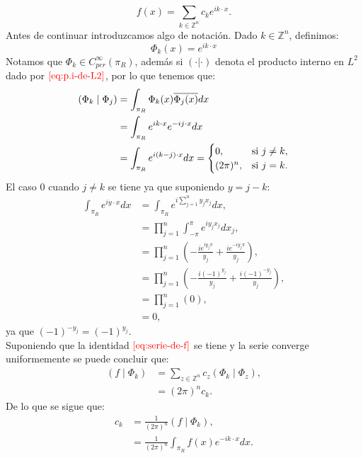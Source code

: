     \begin{equation}
      f(x)=\sum_{k\in\mathbb{Z}^{n}}c_ke^{ik\cdot x}.\label{eq:serie-de-f}
    \end{equation}
    Antes de continuar introduzcamos algo de notación. Dado $k\in\mathbb{Z}^n$, definimos:
    \begin{equation}
        \Phi_{k}(x)=e^{ik\cdot x}
    \end{equation}
    Notamos que $\Phi_k\in C^{\infty}_{per}(\pi_R)$, además si $(\cdot|\cdot)$ denota el producto interno en $L^2$ dado por $\textcolor{red}{\ref{eq:p.i-de-L2}}$, por lo que tenemos que:
    \begin{align}
      \left( \Phi_k \mid \Phi_j \right) &= \int_{\pi_R} \Phi_k(x) \overline{\Phi_j(x)} dx\notag\\ 
      &= \int_{\pi_R} e^{ik\cdot x} e^{-ij\cdot x}dx\notag{}\\
      &=\int_{\pi_R}e^{i(k-j)\cdot x}dx= 
      \begin{cases} 
        0, & \text{si } j \neq k, \\\label{eq:ortogonalidad-de-phi} 
        (2\pi)^n, & \text{si } j = k.
      \end{cases}
    \end{align}
    El caso $0$ cuando $j\neq k$ se tiene ya que suponiendo $y=j-k$:
    \begin{align*}
      \int_{\pi_R}e^{iy\cdot x}dx&=\int_{\pi_R}e^{i\sum_{j=1}^{n}y_jx_j}dx,\\
      &=\prod_{j=1}^{n}\int_{-\pi}^{\pi}e^{iy_jx_j}dx_j,\\
      &=\prod_{j=1}^{n}\left(-\frac{ie^{iy_j\pi}}{y_j}+\frac{ie^{-iy_j\pi}}{y_j}\right),\\
      &=\prod_{j=1}^{n}\left( -\frac{i(-1)^{y_j}}{y_j}+\frac{i(-1)^{-y_j}}{y_j} \right),\\
      &=\prod_{j=1}^{n}(0),\\
      &=0,
    \end{align*}
    ya que $(-1)^{-y_j}=(-1)^{y_j}$.\\
    Suponiendo que la identidad $\textcolor{red}{\ref{eq:serie-de-f}}$ se tiene y la serie converge uniformemente se puede concluir que:
    \begin{align*}
      (f\mid \Phi_k)&=\sum_{z\in\mathbb{Z}^{n}}c_z(\Phi_k\mid \Phi_z),\\
      &=(2\pi)^{n}c_k.
    \end{align*}
    De lo que se sigue que:
    \begin{align*}
      c_k&=\frac{1}{(2\pi)^{n}}(f\mid \Phi_k),\\
      &=\frac{1}{(2\pi)^{n}}\int_{\pi_R}f(x)e^{-ik\cdot x}dx.
    \end{align*}
